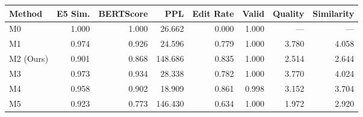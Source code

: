 \begin{tabular}{lrrrrrrr}
\toprule
Method & E5 Sim. & BERTScore & PPL & Edit Rate & Valid & Quality & Similarity \\
\midrule
M0 & 1.000 & 1.000 & 26.662 & 0.000 & 1.000 & --- & --- \\
M1 & 0.974 & 0.926 & 24.596 & 0.779 & 1.000 & 3.780 & 4.058 \\
M2 (Ours) & 0.901 & 0.868 & 148.686 & 0.835 & 1.000 & 2.514 & 2.644 \\
M3 & 0.973 & 0.934 & 28.338 & 0.782 & 1.000 & 3.770 & 4.024 \\
M4 & 0.958 & 0.902 & 18.909 & 0.861 & 0.998 & 3.152 & 3.704 \\
M5 & 0.923 & 0.773 & 146.430 & 0.634 & 1.000 & 1.972 & 2.920 \\
\bottomrule
\end{tabular}
